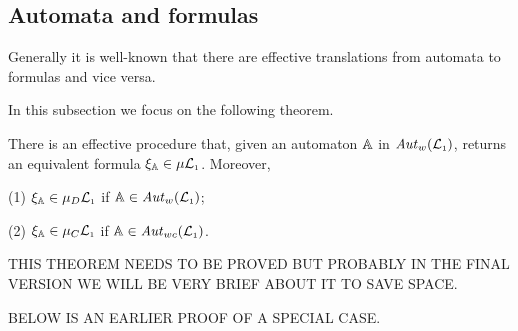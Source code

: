 \subsection{Automata and formulas}

\btbs
\item
Generally it is well-known that there are effective translations from automata
to formulas and vice versa.
\item
In this subsection we focus on the following theorem.
\etbs


\begin{theorem}\label{t:autofor}
There is an effective procedure that, given an automaton $\mathbb{A}$ in 
$\mathit{Aut}_{w}(\mathcal{L}_{\scriptscriptstyle 1})$, returns an equivalent formula $\xi_{\mathbb{A}} \in \mu\mathcal{L}_{\scriptscriptstyle 1}$. 
Moreover, 

(1) $\xi_{\mathbb{A}} \in \mu_{D}\mathcal{L}_{\scriptscriptstyle 1}$ if $\mathbb{A} \in \mathit{Aut}_{w}(\mathcal{L}_{\scriptscriptstyle 1})$;

(2) $\xi_{\mathbb{A}} \in \mu_{C}\mathcal{L}_{\scriptscriptstyle 1}$ if $\mathbb{A} \in \mathit{Aut}_{wc}(\mathcal{L}_{\scriptscriptstyle 1})$.
\end{theorem}

\btbs
\item
THIS THEOREM NEEDS TO BE PROVED BUT PROBABLY IN THE FINAL VERSION WE 
WILL BE VERY BRIEF ABOUT IT TO SAVE SPACE.
\item
BELOW IS AN EARLIER PROOF OF A SPECIAL CASE.
\etbs

